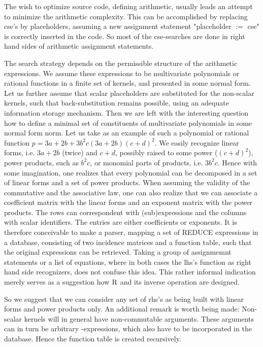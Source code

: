 The wish to optimize source code, defining arithmetic, usually leads an attempt
to minimize the arithmetic complexity. This can be accomplished by replacing 
cse's by placeholders, assuming a new assignment 
statement "placeholder $:=$ cse" is correctly inserted in the code. 
So most of the cse-searches are done in right hand sides of 
arithmetic assignment statements.

The search strategy depends on the permissible structure of the arithmetic
expressions. We assume these expressions to be multivariate polynomials
or rational functions in a finite set of kernels, and  presented in some 
normal form. Let us further assume that scalar placeholders are substituted
for the non-scalar kernels, such that back-substitution remains possible,
using an adequate information storage mechanism. Then we are left with 
the interesting question how to define a minimal set of constituents of
multivariate polynomials in some normal form norm.  Let us take as an 
example of such a polynomial or rational function $p = 3a + 2b +  3 {b^2} c 
(3a + 2b){(c + d)^2}$.  We easily recognize linear forms, i.e. $3a + 2b$
(twice) and  $c + d$, possibly raised to some power (${(c + d)}^2$), power
products, such as ${b^2} c$, or monomial parts of products, i.e. $3 {b^2} c$.
Hence with some imagination, one realizes that every polynomial can be
decomposed in a set of linear forms and a set of power products. When 
assuming the validity of the commutative and the associative law, one can also
realize that we can associate a coefficient matrix with the linear forms and 
an exponent matrix with the power products. The rows can correspondent
with (sub)\-ex\-pressions and the columns with scalar identifiers.
The entries are either coefficients or exponents.
It is therefore conceivable to make a parser, mapping a set of REDUCE 
expressions in a database, consisting of two 
incidence matrices and a function table, such that the original expressions 
can be retrieved. Taking a group of assignmemnt statements or a list of 
equations, where in both cases the lhs's function as right hand side 
recognizers, does not confuse this idea. This rather informal indication
merely serves as a suggestion how ${\rm R}$ and its inverse operation are
designed.

So we suggest that we can consider any set of rhs's as being built with 
linear forms and power products only.  An additional remark is worth being 
made: Non-scalar kernels will in general have non-commutable arguments. 
These arguments  can in turn be arbitrary {\REDUCE}-expressions, which 
also have to be incorporated in the database.  Hence the function table 
is created recursively.

